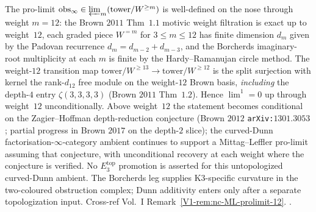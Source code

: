 \begin{remark}
\label{rem:cdhg-ML-12}
The pro-limit
$\mathrm{obs}_\infty \in \varprojlim_{m}(\mathrm{tower}/W^{\ge m})$
is well-defined on the nose through weight $m = 12$: the Brown $2011$
Thm~$1.1$ motivic weight filtration is exact up to weight~$12$, each
graded piece $W^{= m}$ for $3\le m\le 12$ has finite dimension $d_m$
given by the Padovan recurrence $d_m=d_{m-2}+d_{m-3}$,
and the Borcherds imaginary-root
multiplicity at each $m$ is finite by the Hardy--Ramanujan circle
method. The weight-$12$ transition map
$\mathrm{tower}/W^{\ge 13}\to\mathrm{tower}/W^{\ge 12}$ is the split
surjection with kernel the rank-$d_{12}$ free module on the weight-$12$
Brown basis, \emph{including} the depth-$4$ entry $\zeta(3,3,3,3)$
(Brown $2011$ Thm~$1.2$). Hence $\lim^1 = 0$ up through
weight~$12$ unconditionally. Above weight~$12$ the statement
becomes conditional on the Zagier--Hoffman depth-reduction
conjecture (Brown $2012$ \texttt{arXiv:$1301.3053$}; partial progress
in Brown $2017$ on the depth-$2$ slice); the curved-Dunn
factorisation-$\infty$-category ambient continues to support a
Mittag--Leffler pro-limit assuming that conjecture, with
unconditional recovery at each weight where the
conjecture is verified. No $E_3^{\mathrm{top}}$ promotion is asserted
for this untopologized curved-Dunn ambient. The Borcherds leg supplies
K$3$-specific curvature in the two-coloured obstruction complex; Dunn
additivity enters only after a separate topologization input. Cross-ref
Vol.~I
Remark~\ref{V1-rem:nc-ML-prolimit-12}.
\cite{Brown2011,Brown2012,Deligne2013,MarklShniderStasheff2002,
 HardyRamanujan1918,GritsenkoNikulin1998}.
\end{remark}

